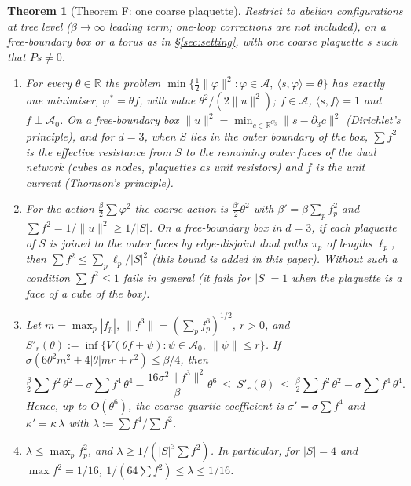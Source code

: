 \documentclass[11pt,a4paper]{article}
\newtheorem{theorem}{Theorem}[section]
\theoremstyle{definition}
\theoremstyle{remark}
\newcommand{\R}{\mathbb{R}}
\newcommand{\cA}{\mathcal{A}}
\begin{document}
\begin{theorem}[Theorem F: one coarse plaquette]\label{thm:F}
Restrict to abelian configurations at tree level ($\beta\to\infty$ leading term; one-loop corrections are not included), on a free-boundary box or a torus as in \S\ref{sec:setting}, with one coarse plaquette $s$ such that $Ps\neq0$.
\begin{enumerate}[label=(\roman*)]
\item For every $\theta\in\R$ the problem $\min\{\frac12\|\varphi\|^2:\varphi\in\cA,\ \langle s,\varphi\rangle=\theta\}$ has exactly one minimiser, $\varphi^*=\theta f$, with value $\theta^2/(2\|u\|^2)$; $f\in\cA$, $\langle s,f\rangle=1$ and $f\perp\cA_0$. On a free-boundary box $\|u\|^2=\min_{c\in\R^{C_3}}\|s-\partial_3c\|^2$ (Dirichlet's principle), and for $d=3$, when $S$ lies in the outer boundary of the box, $\sum f^2$ is the effective resistance from $S$ to the remaining outer faces of the dual network (cubes as nodes, plaquettes as unit resistors) and $f$ is the unit current (Thomson's principle).
\item For the action $\frac\beta2\sum\varphi^2$ the coarse action is $\frac{\beta'}{2}\theta^2$ with $\beta'=\beta\sum_pf_p^2$ and $\sum f^2=1/\|u\|^2\ge1/|S|$. On a free-boundary box in $d=3$, if each plaquette of $S$ is joined to the outer faces by edge-disjoint dual paths $\pi_p$ of lengths $\ell_p$, then $\sum f^2\le\sum_p\ell_p/|S|^2$ (this bound is added in this paper). Without such a condition $\sum f^2\le1$ fails in general (it fails for $|S|=1$ when the plaquette is a face of a cube of the box).
\item Let $m=\max_p|f_p|$, $\|f^3\|=(\sum_pf_p^6)^{1/2}$, $r>0$, and $S'_r(\theta):=\inf\{V(\theta f+\psi):\psi\in\cA_0,\ \|\psi\|\le r\}$. If $\sigma(6\theta^2m^2+4|\theta|mr+r^2)\le\beta/4$, then
\[
\tfrac{\beta}{2}{\textstyle\sum} f^2\,\theta^2-\sigma{\textstyle\sum} f^4\,\theta^4-\frac{16\sigma^2\|f^3\|^2}{\beta}\theta^6\ \le\ S'_r(\theta)\ \le\ \tfrac{\beta}{2}{\textstyle\sum} f^2\,\theta^2-\sigma{\textstyle\sum} f^4\,\theta^4 .
\]
Hence, up to $O(\theta^6)$, the coarse quartic coefficient is $\sigma'=\sigma\sum f^4$ and $\kappa'=\kappa\,\lambda$ with $\lambda:=\sum f^4/\sum f^2$.
\item $\lambda\le\max_pf_p^2$, and $\lambda\ge 1/(|S|^3\sum f^2)$. In particular, for $|S|=4$ and $\max f^2=1/16$, $1/(64\sum f^2)\le\lambda\le1/16$.
\end{enumerate}
\end{theorem}
\end{document}
